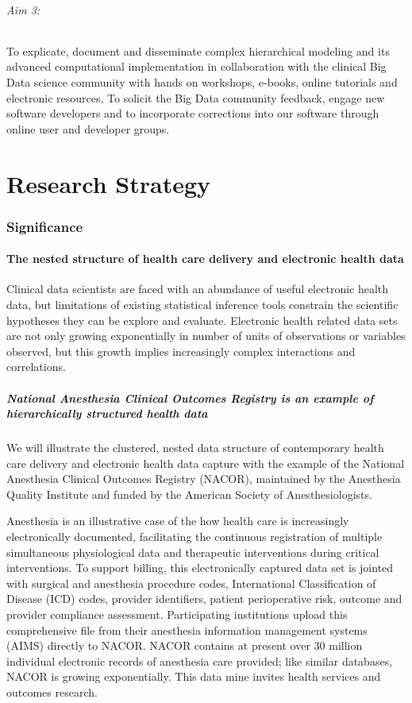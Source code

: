 \documentclass[11pt,notitlepage]{article}
\begin{document}
\paragraph*{Aim 3:} To explicate, document and disseminate complex hierarchical modeling and its advanced computational implementation in collaboration with the clinical Big Data science community with hands on workshops, e-books, online tutorials and electronic resources. To solicit the Big Data community feedback, engage new software developers and to incorporate corrections into our software through online user and developer groups.

\part*{Research Strategy}

\section*{Significance}

\subsection*{The nested structure of health care delivery and electronic health data}
Clinical data scientists are faced with an abundance of useful electronic health data, but limitations of existing statistical inference tools constrain the scientific hypotheses they can be explore and evaluate. Electronic health related data sets are not only growing exponentially in number of units of observations or variables observed, but this growth implies increasingly complex interactions and correlations. 

\subsubsection*{National Anesthesia Clinical Outcomes Registry is an example of hierarchically structured health data}
We will illustrate the clustered, nested data structure of contemporary health care delivery and electronic health data capture with the example of the National Anesthesia Clinical Outcomes Registry (NACOR), maintained by the Anesthesia Quality Institute and funded by the American Society of Anesthesiologists. 

Anesthesia is an illustrative case of the how health care is increasingly electronically documented, facilitating the continuous registration of multiple simultaneous physiological   data and therapeutic interventions during critical interventions. To support billing, this electronically captured data set is jointed with surgical and anesthesia procedure codes, International Classification of Disease (ICD) codes, provider identifiers, patient perioperative risk, outcome and provider compliance assessment. Participating institutions upload this comprehensive file from their anesthesia information management systems (AIMS) directly to NACOR. NACOR contains at present over 30 million individual electronic records of anesthesia care provided; like similar databases, NACOR is growing exponentially. This data mine invites health services and outcomes research.
\end{document}
